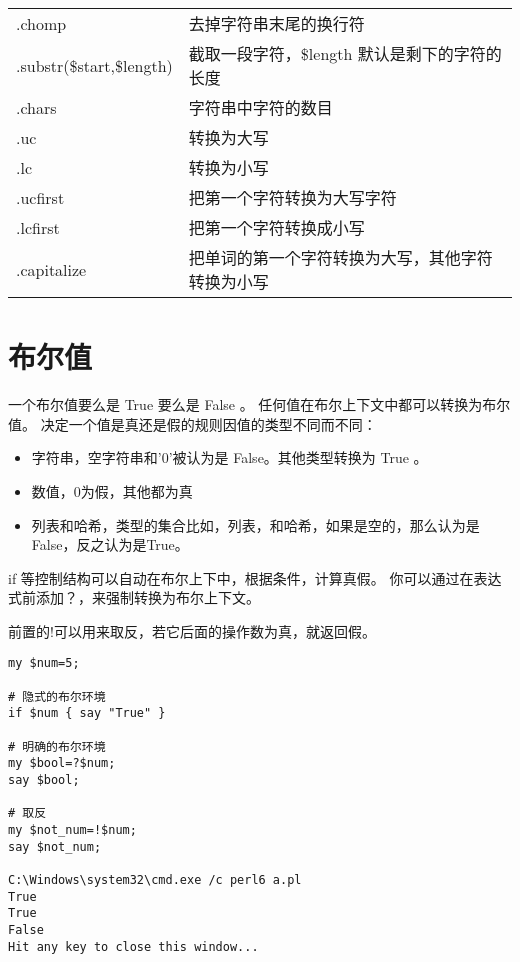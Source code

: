 \documentclass{ctexart}
\begin{document}
\begin{center}
\begin{tabular}{ll}
 .chomp                     &  去掉字符串末尾的换行符                            \\
 .substr(\$start,\$length)  &  截取一段字符，\$length 默认是剩下的字符的长度     \\
 .chars                     &  字符串中字符的数目                                \\
 .uc                        &  转换为大写                                        \\
 .lc                        &  转换为小写                                        \\
 .ucfirst                   &  把第一个字符转换为大写字符                        \\
 .lcfirst                   &  把第一个字符转换成小写                            \\
 .capitalize                &  把单词的第一个字符转换为大写，其他字符转换为小写  \\
\end{tabular}
\end{center}
\section{布尔值}
\label{sec-5}

一个布尔值要么是 True 要么是 False 。
任何值在布尔上下文中都可以转换为布尔值。
决定一个值是真还是假的规则因值的类型不同而不同：
\begin{itemize}
\item 字符串，空字符串和'0'被认为是 False。其他类型转换为 True 。
\item 数值，0为假，其他都为真
\item 列表和哈希，类型的集合比如，列表，和哈希，如果是空的，那么认为是False，反之认为是True。
\end{itemize}

if 等控制结构可以自动在布尔上下中，根据条件，计算真假。
你可以通过在表达式前添加？，来强制转换为布尔上下文。

前置的!可以用来取反，若它后面的操作数为真，就返回假。

\begin{lstlisting}
my $num=5;

# 隐式的布尔环境
if $num { say "True" }

# 明确的布尔环境
my $bool=?$num;
say $bool;

# 取反
my $not_num=!$num;
say $not_num;

C:\Windows\system32\cmd.exe /c perl6 a.pl
True
True
False
Hit any key to close this window...
\end{lstlisting}
\end{document}
